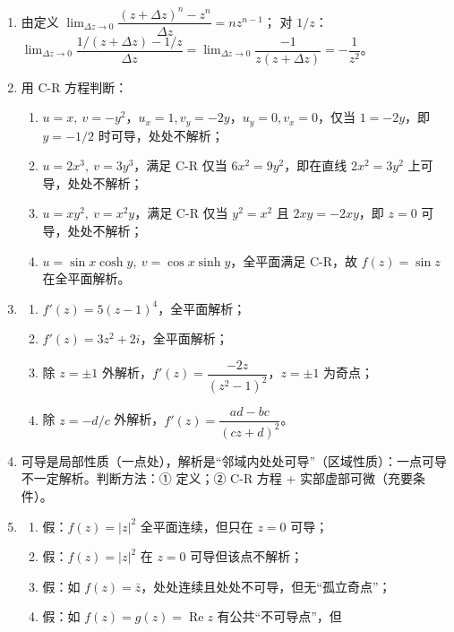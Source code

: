 \begin{enumerate}
\def\labelenumi{\arabic{enumi}.}
\item
  由定义
  \(\lim_{\Delta z\to0}\dfrac{(z+\Delta z)^n-z^n}{\Delta z}=nz^{n-1}\)；
  对
  \(1/z\)：\(\lim_{\Delta z\to0}\dfrac{1/(z+\Delta z)-1/z}{\Delta z}=\lim_{\Delta z\to0}\dfrac{-1}{z(z+\Delta z)}=-\dfrac1{z^2}\)。
\item
  用 C-R 方程判断：

  \begin{enumerate}
  \def\labelenumii{(\arabic{enumii})}
  \tightlist
  \item
    \(u=x,\ v=-y^2\)，\(u_x=1,v_y=-2y\)，\(u_y=0,v_x=0\)，仅当
    \(1=-2y\)，即 \(y=-1/2\) 时可导，处处不解析；
  \item
    \(u=2x^3,\ v=3y^3\)，满足 C-R 仅当 \(6x^2=9y^2\)，即在直线
    \(2x^2=3y^2\) 上可导，处处不解析；
  \item
    \(u=xy^2,\ v=x^2y\)，满足 C-R 仅当 \(y^2=x^2\) 且 \(2xy=-2xy\)，即
    \(z=0\) 可导，处处不解析；
  \item
    \(u=\sin x\cosh y,\ v=\cos x\sinh y\)，全平面满足 C-R，故
    \(f(z)=\sin z\) 在全平面解析。
  \end{enumerate}
\item
  \begin{enumerate}
  \def\labelenumii{(\arabic{enumii})}
  \tightlist
  \item
    \(f'(z)=5(z-1)^4\)，全平面解析；
  \item
    \(f'(z)=3z^2+2i\)，全平面解析；
  \item
    除 \(z=\pm1\) 外解析，\(f'(z)=\dfrac{-2z}{(z^2-1)^2}\)，\(z=\pm1\)
    为奇点；
  \item
    除 \(z=-d/c\) 外解析，\(f'(z)=\dfrac{ad-bc}{(cz+d)^2}\)。
  \end{enumerate}
\item
  可导是局部性质（一点处），解析是``邻域内处处可导''（区域性质）：一点可导不一定解析。判断方法：①
  定义；② C-R 方程 + 实部虚部可微（充要条件）。
\item
  \begin{enumerate}
  \def\labelenumii{(\arabic{enumii})}
  \tightlist
  \item
    假：\(f(z)=|z|^2\) 全平面连续，但只在 \(z=0\) 可导；
  \item
    假：\(f(z)=|z|^2\) 在 \(z=0\) 可导但该点不解析；
  \item
    假：如 \(f(z)=\bar z\)，处处连续且处处不可导，但无``孤立奇点''；
  \item
    假：如 \(f(z)=g(z)=\operatorname{Re}z\) 有公共``不可导点''，但

\end{enumerate}
\end{enumerate}
